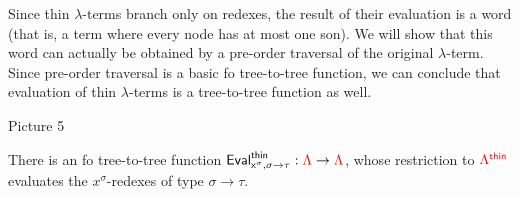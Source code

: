 Since thin $\lambda$-terms branch only on redexes, the result of their evaluation is a word (that is, a term where every node has at most one son).  We will show that this word can actually be obtained by a pre-order traversal of the original $\lambda$-term. 
Since pre-order traversal is a basic fo tree-to-tree function, we can conclude that evaluation of thin $\lambda$-terms is a tree-to-tree function as well. 

\begin{center}
Picture 5
\end{center}

\begin{proposition}\label{prop:EvaluateThin}
There is an fo tree-to-tree function ${\sf{Eval}^{\sf{thin}}_{x^\sigma,\sigma\rightarrow\tau}}:{\color{red}{\Lambda}}\to{\color{red}{\Lambda}}$, whose restriction to ${\color{red}{\Lambda^{\sf{thin}}}}$ evaluates the $x^\sigma$-redexes of type $\sigma\rightarrow\tau$.
\end{proposition}

